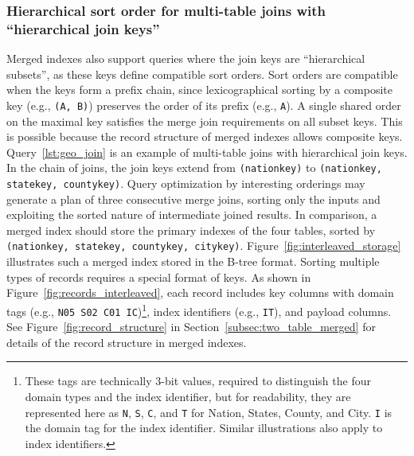 \documentclass[sigconf, pdfa, nonacm]{acmart}
\begin{document}
\subsubsection{Hierarchical sort order for multi-table joins with ``hierarchical join keys''}\label{sssec:hierarchical_join_keys}

Merged indexes also support queries where the join keys are ``hierarchical subsets'', as these keys define compatible sort orders. 
Sort orders are compatible when the keys form a prefix chain, since lexicographical sorting by a composite key (e.g., \texttt{(A, B)}) preserves the order of its prefix (e.g., \texttt{A}).
A single shared order on the maximal key satisfies the merge join requirements on all subset keys. This is possible because the record structure of merged indexes allows composite keys.
Query~\ref{lst:geo_join} is an example of multi-table joins with hierarchical join keys. In the chain of joins, the join keys extend from \texttt{(nationkey)} to \texttt{(nationkey, statekey, countykey)}. Query optimization by interesting orderings may generate a plan of three consecutive merge joins, sorting only the inputs and exploiting the sorted nature of intermediate joined results.
In comparison, a merged index should store the primary indexes of the four tables, sorted by \texttt{(nationkey, statekey, countykey, citykey)}. Figure~\ref{fig:interleaved_storage} illustrates such a merged index stored in the B-tree format.
Sorting multiple types of records requires a special format of keys.
As shown in Figure~\ref{fig:records_interleaved}, each record includes key columns with domain tags (e.g., \texttt{N05 S02 C01 IC})\footnote{
    These tags are technically 3-bit values, required to distinguish the four domain types and the index identifier, but for readability, they are represented here as \texttt{N}, \texttt{S}, \texttt{C}, and \texttt{T} for Nation, States, County, and City. \texttt{I} is the domain tag for the index identifier. Similar illustrations also apply to index identifiers.
    }, index identifiers (e.g., \texttt{IT}), and payload columns.
See Figure~\ref{fig:record_structure} in Section~\ref{subsec:two_table_merged} for details of the record structure in merged indexes.
\end{document}
